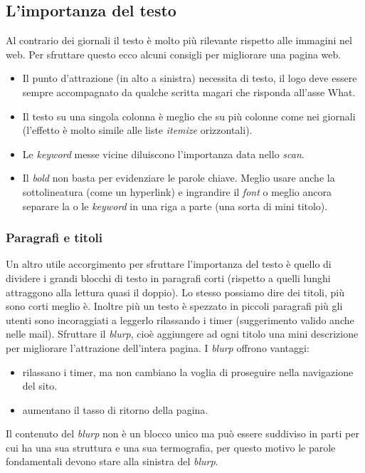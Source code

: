 		\subsection{L'importanza del testo}
			Al contrario dei giornali il testo è molto più rilevante rispetto alle immagini nel web. Per sfruttare questo ecco alcuni consigli per migliorare una pagina web.
			\begin{itemize}
				\item Il punto d'attrazione (in alto a sinistra) necessita di testo, il logo deve essere sempre accompagnato da qualche scritta magari che risponda all'asse What.
				\item Il testo su una singola colonna è meglio che su più colonne come nei giornali (l'effetto è molto simile alle liste \emph{itemize} orizzontali).
				\item Le \emph{keyword} messe vicine diluiscono l'importanza data nello \emph{scan}.
				\item Il \emph{bold} non basta per evidenziare le parole chiave. Meglio usare anche la sottolineatura (come un hyperlink) e ingrandire il \emph{font} o meglio ancora separare la o le \emph{keyword} in una riga a parte (una sorta di mini titolo).
			\end{itemize}
		
			\subsubsection{Paragrafi e titoli}
				Un altro utile accorgimento per sfruttare l'importanza del testo è quello di dividere i grandi blocchi di testo in paragrafi corti (rispetto a quelli lunghi attraggono alla lettura quasi il doppio). Lo stesso possiamo dire dei titoli, più sono corti meglio è. Inoltre più un testo è spezzato in piccoli paragrafi più gli utenti sono incoraggiati a leggerlo rilassando i timer (suggerimento valido anche nelle mail).
				Sfruttare il \emph{blurp}, cioè aggiungere ad ogni titolo una mini descrizione per migliorare l'attrazione dell'intera pagina. I \emph{blurp} offrono vantaggi:
				\begin{itemize}
					\item rilassano i timer, ma non cambiano la voglia di proseguire nella navigazione del sito.
					\item aumentano il tasso di ritorno della pagina.
				\end{itemize}
				Il contenuto del \emph{blurp} non è un blocco unico ma può essere suddiviso in parti per cui ha una sua struttura e una sua termografia, per questo motivo le parole fondamentali devono stare alla sinistra del \emph{blurp}.
			
